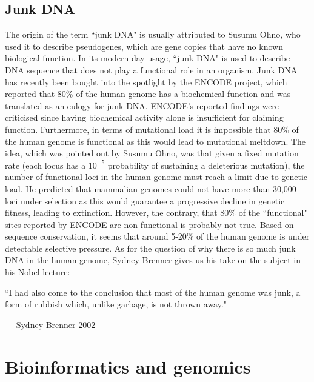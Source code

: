 \subsection{Junk DNA}

The origin of the term ``junk DNA" is usually attributed to Susumu Ohno\cite{pmid5065367}, who used it to describe pseudogenes, which are gene copies that have no known biological function. In its modern day usage, ``junk DNA" is used to describe DNA sequence that does not play a functional role in an organism. Junk DNA has recently been bought into the spotlight by the ENCODE project, which reported that 80\% of the human genome has a biochemical function\cite{pmid22955616} and was translated as an eulogy for junk DNA\cite{Pennisi07092012}. ENCODE's reported findings were criticised since having biochemical activity alone is insufficient for claiming function\cite{pmid23431001, pmid23479647, Eddy2012}. Furthermore, in terms of mutational load it is impossible that 80\% of the human genome is functional as this would lead to mutational meltdown\cite{pmid24809441}. The idea, which was pointed out by Susumu Ohno\cite{pmid5065367}, was that given a fixed mutation rate (each locus has a $10^{-5}$ probability of sustaining a deleterious mutation), the number of functional loci in the human genome must reach a limit due to genetic load. He predicted that mammalian genomes could not have more than 30,000 loci under selection as this would guarantee a progressive decline in genetic fitness, leading to extinction. However, the contrary, that 80\% of the ``functional" sites reported by ENCODE are non-functional is probably not true. Based on sequence conservation, it seems that around 5-20\% of the human genome is under detectable selective pressure\cite{Eddy2012}. As for the question of why there is so much junk DNA in the human genome, Sydney Brenner gives us his take on the subject in his Nobel lecture\cite{brennernobellecture}:

\epigraph{``I had also come to the conclusion that most of the human genome was junk, a form of rubbish which, unlike garbage, is not thrown away."}{--- \textup{Sydney Brenner 2002}}

\section{Bioinformatics and genomics}


